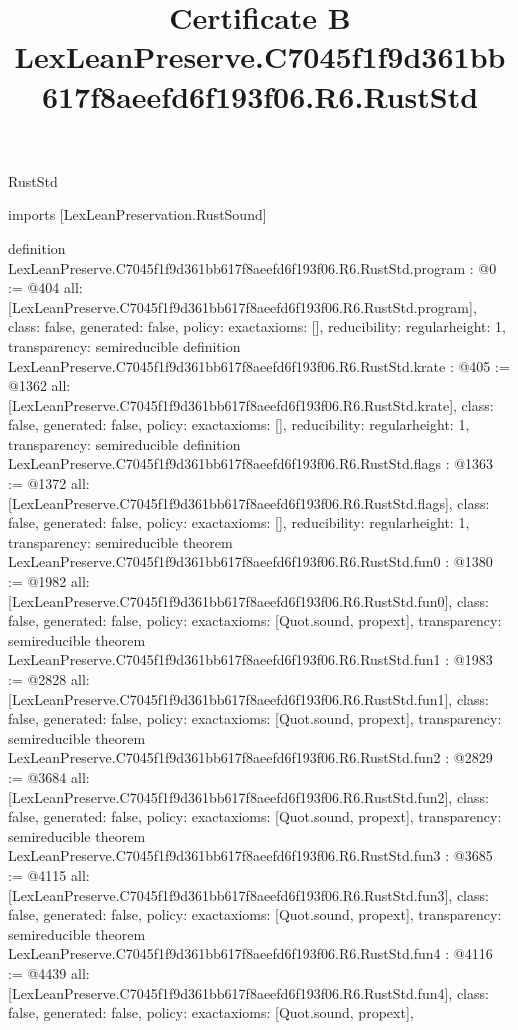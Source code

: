 \begin{lexlean}{RustStd}
\title{Certificate B LexLeanPreserve.C7045f1f9d361bb617f8aeefd6f193f06.R6.RustStd}
\begin{coremodule}
imports [LexLeanPreservation.RustSound]

definition LexLeanPreserve.C7045f1f9d361bb617f8aeefd6f193f06.R6.RustStd.program : @0 := @404 {
  all: [LexLeanPreserve.C7045f1f9d361bb617f8aeefd6f193f06.R6.RustStd.program],
  class: false,
  generated: false,
  policy: exact{axioms: []},
  reducibility: regular{height: 1},
  transparency: semireducible
}
definition LexLeanPreserve.C7045f1f9d361bb617f8aeefd6f193f06.R6.RustStd.krate : @405 := @1362 {
  all: [LexLeanPreserve.C7045f1f9d361bb617f8aeefd6f193f06.R6.RustStd.krate],
  class: false,
  generated: false,
  policy: exact{axioms: []},
  reducibility: regular{height: 1},
  transparency: semireducible
}
definition LexLeanPreserve.C7045f1f9d361bb617f8aeefd6f193f06.R6.RustStd.flags : @1363 := @1372 {
  all: [LexLeanPreserve.C7045f1f9d361bb617f8aeefd6f193f06.R6.RustStd.flags],
  class: false,
  generated: false,
  policy: exact{axioms: []},
  reducibility: regular{height: 1},
  transparency: semireducible
}
theorem LexLeanPreserve.C7045f1f9d361bb617f8aeefd6f193f06.R6.RustStd.fun0 : @1380 := @1982 {
  all: [LexLeanPreserve.C7045f1f9d361bb617f8aeefd6f193f06.R6.RustStd.fun0],
  class: false,
  generated: false,
  policy: exact{axioms: [Quot.sound, propext]},
  transparency: semireducible
}
theorem LexLeanPreserve.C7045f1f9d361bb617f8aeefd6f193f06.R6.RustStd.fun1 : @1983 := @2828 {
  all: [LexLeanPreserve.C7045f1f9d361bb617f8aeefd6f193f06.R6.RustStd.fun1],
  class: false,
  generated: false,
  policy: exact{axioms: [Quot.sound, propext]},
  transparency: semireducible
}
theorem LexLeanPreserve.C7045f1f9d361bb617f8aeefd6f193f06.R6.RustStd.fun2 : @2829 := @3684 {
  all: [LexLeanPreserve.C7045f1f9d361bb617f8aeefd6f193f06.R6.RustStd.fun2],
  class: false,
  generated: false,
  policy: exact{axioms: [Quot.sound, propext]},
  transparency: semireducible
}
theorem LexLeanPreserve.C7045f1f9d361bb617f8aeefd6f193f06.R6.RustStd.fun3 : @3685 := @4115 {
  all: [LexLeanPreserve.C7045f1f9d361bb617f8aeefd6f193f06.R6.RustStd.fun3],
  class: false,
  generated: false,
  policy: exact{axioms: [Quot.sound, propext]},
  transparency: semireducible
}
theorem LexLeanPreserve.C7045f1f9d361bb617f8aeefd6f193f06.R6.RustStd.fun4 : @4116 := @4439 {
  all: [LexLeanPreserve.C7045f1f9d361bb617f8aeefd6f193f06.R6.RustStd.fun4],
  class: false,
  generated: false,
  policy: exact{axioms: [Quot.sound, propext]},
}
\end{coremodule}
\end{lexlean}
